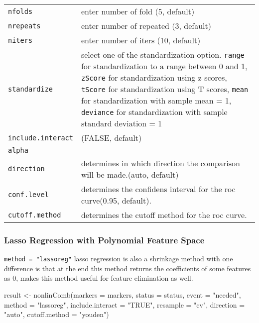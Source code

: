 \documentclass[]{article}
\newcommand{\hlstr}[1]{\textcolor[rgb]{0.251,0.627,0.251}{#1}}%
\newcommand{\hlstd}[1]{\textcolor[rgb]{0.251,0.251,0.251}{#1}}%
\newenvironment{Shaded}{\begin{myshaded}}{\end{myshaded}}
\newcommand{\StringTok}[1]{\hlstr{#1}}
\newcommand{\OtherTok}[1]{{#1}}
\newcommand{\FunctionTok}[1]{\hlstd{#1}}
\newcommand{\AttributeTok}[1]{{#1}}
\newcommand{\NormalTok}[1]{\hlstd{#1}}
\begin{document}
\begin{longtable}[]{@{}
  >{\raggedright\arraybackslash}p{}
  >{\raggedright\arraybackslash}p{}@{}}
\texttt{nfolds} & enter number of fold (5, default) \\
\texttt{nrepeats} & enter number of repeated (3, default) \\
\texttt{niters} & enter number of iters (10, default) \\
\texttt{standardize} & select one of the standardization option. \texttt{range} for standardization to a range between 0 and 1, \texttt{zScore} for standardization using z scores, \texttt{tScore} for standardization using T scores, \texttt{mean} for standardization with sample mean = 1, \texttt{deviance} for standardization with sample standard deviation = 1 \\
\texttt{include.interact} & (FALSE, default) \\
\texttt{alpha} & \\
\texttt{direction} & determines in which direction the comparison will be made.(auto, default) \\
\texttt{conf.level} & determines the confidens interval for the roc curve(0.95, default). \\
\texttt{cutoff.method} & determines the cutoff method for the roc curve. \\
\bottomrule
\end{longtable}

\hypertarget{lasso-regression-with-polynomial-feature-space}{%
\subsubsection{Lasso Regression with Polynomial Feature Space}\label{lasso-regression-with-polynomial-feature-space}}

\texttt{method = "lassoreg"} lasso regression is also a shrinkage method with one difference is that at the end this method returns the coefficients of some features as 0, makes this method useful for feature elimination as well.

\begin{Shaded}
\begin{Highlighting}[]
\NormalTok{result }\OtherTok{\textless{}{-}} \FunctionTok{nonlinComb}\NormalTok{(}\AttributeTok{markers =}\NormalTok{ markers, }
                  \AttributeTok{status =}\NormalTok{ status, }
                  \AttributeTok{event =} \StringTok{"needed"}\NormalTok{, }
                  \AttributeTok{method =} \StringTok{"lassoreg"}\NormalTok{, }
                  \AttributeTok{include.interact =} \StringTok{"TRUE"}\NormalTok{,}
                  \AttributeTok{resample =} \StringTok{"cv"}\NormalTok{, }
                  \AttributeTok{direction =} \StringTok{"auto"}\NormalTok{, }
                  \AttributeTok{cutoff.method =} \StringTok{"youden"}\NormalTok{)}
\end{Highlighting}
\end{Shaded}
\end{document}
